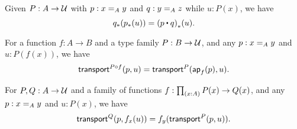 \begin{lem}
    \label{thm:transport-concat}
    Given $P:A\to\type$ with $p:\id[A]xy$ and $q:\id[A]yz$ while $u:P(x)$, we have
    \[ \trans{q}{\trans{p}{u}} = \trans{(p\ct q)}{u}. \]
\end{lem}

\begin{lem}
    \label{thm:transport-compose}
    For a function $f:A\to B$ and a type family $P:B\to\type$, and any $p:\id[A]xy$ and $u:P(f(x))$, we have
    \[ \transfib{P\circ f}{p}{u} = \transfib{P}{\apfunc f(p)}{u}. \]
\end{lem}

\begin{lem}
    \label{thm:ap-transport}
    For $P,Q:A\to \type$ and a family of functions $f:\prd{x:A} P(x)\to Q(x)$, and any $p:\id[A]xy$ and $u:P(x)$, we have
    \[ \transfib{Q}{p}{f_x(u)} = f_y(\transfib{P}{p}{u}). \]
\end{lem}

%
